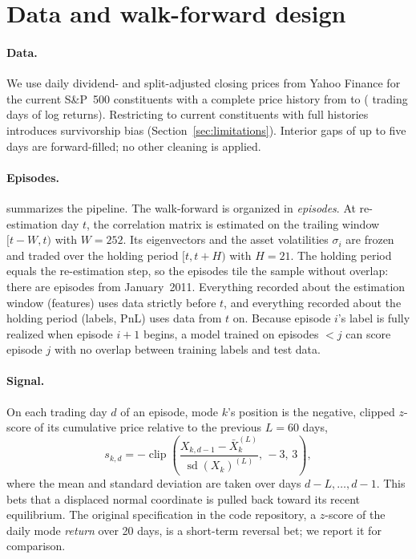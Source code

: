 \section{Data and walk-forward design}
\label{sec:design}



\paragraph{Data.} We use daily dividend- and split-adjusted closing
prices from Yahoo Finance for the \DataAssets{} current S\&P~500
constituents with a complete price history from \DataStart{} to
\DataEnd{} (\DataDays{} trading days of log returns). Restricting to
current constituents with full histories introduces survivorship bias
(Section~\ref{sec:limitations}). Interior gaps of up to five days are
forward-filled; no other cleaning is applied.

\paragraph{Episodes.}  summarizes the pipeline. The walk-forward is organized in \emph{episodes}.
At re-estimation day $t$, the correlation matrix is estimated on the
trailing window $[t-W,t)$ with $W=252$. Its eigenvectors and the asset
volatilities $\sigma_i$ are frozen and traded over the holding period
$[t,t+H)$ with $H=21$. The holding period equals the re-estimation step,
so the episodes tile the sample without overlap: there are
\NEpisodes{} episodes from January~2011. Everything recorded about the
estimation window (features) uses data strictly before $t$, and
everything recorded about the holding period (labels, PnL) uses data
from $t$ on. Because episode $i$'s label is fully realized when episode
$i+1$ begins, a model trained on episodes $<j$ can score episode $j$
with no overlap between training labels and test data.

\paragraph{Signal.} On each trading day $d$ of an episode, mode $k$'s
position is the negative, clipped $z$-score of its cumulative price
relative to the previous $L=60$ days,
\begin{equation}
  s_{k,d} = -\operatorname{clip}\!\left(
    \frac{X_{k,d-1}-\bar X_{k}^{(L)}}{\operatorname{sd}(X_{k})^{(L)}},\,-3,\,3\right),
  \label{eq:signal}
\end{equation}
where the mean and standard deviation are taken over days $d-L,\dots,d-1$.
This bets that a displaced normal coordinate is pulled back toward its
recent equilibrium. The original specification in the code repository,
a $z$-score of the daily mode \emph{return} over 20 days, is a
short-term reversal bet; we report it for comparison.

